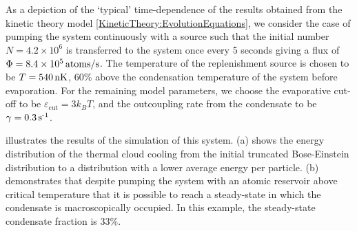 As a depiction of the `typical' time-dependence of the results obtained from the kinetic theory model \eqref{KineticTheory:EvolutionEquations}, we consider the case of pumping the system continuously with a source such that the initial number $N = 4.2\times 10^6$ is transferred to the system once every 5 seconds giving a flux of $\Phi = \unit[8.4 \times 10^5]{atoms/s}$.  The temperature of the replenishment source is chosen to be $T=\unit[540]{nK}$, 60\% above the condensation temperature of the system before evaporation.  For the remaining model parameters, we choose the evaporative cut-off to be $\varepsilon_\text{cut} = 3 k_B T$, and the outcoupling rate from the condensate to be $\gamma = \unit[0.3]{s\textsuperscript{-1}}$.  

 illustrates the results of the simulation of this system.  (a) shows the energy distribution of the thermal cloud cooling from the initial truncated Bose-Einstein distribution to a distribution with a lower average energy per particle.  (b) demonstrates that despite pumping the system with an atomic reservoir above critical temperature that it is possible to reach a steady-state in which the condensate is macroscopically occupied.  In this example, the steady-state condensate fraction is 33\%.


